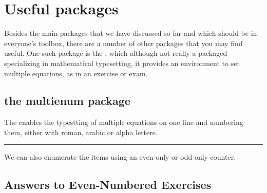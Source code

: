 {{{{\section{Useful packages}

Besides the main packages that we have discussed so far and which should be in everyone's toolbox, there are a number of other packages that you may find useful. One such package is the , which although not really a packaged specializing in mathematical typesetting, it provides an environment to set multiple equations, as in an exercise or exam.



\subsection{the multienum package}

The  enables  the typestting of multiple equations on one line and numbering them, either with roman, arabic or alpha letters.



\begin{multienumerate}[oddlist]
\end{multienumerate}
\begin{multienumerate}[evenlist]
\end{multienumerate}


\hrule

\bigskip

We can also enumerate the items using an even-only or odd only
counter.
\subsection*{Answers to Even-Numbered Exercises}
\begin{multienumerate}[evenlist]
\end{multienumerate}
\bigskip



}}}}
